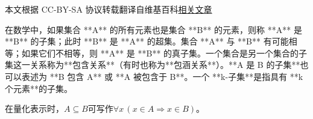 
本文根据 CC-BY-SA 协议转载翻译自维基百科\href{https://en.wikipedia.org/wiki/Subset}{相关文章}

在数学中，如果集合 **A** 的所有元素也是集合 **B** 的元素，则称 **A** 是 **B** 的子集；此时 **B** 是 **A** 的超集。集合 **A** 与 **B** 有可能相等；如果它们不相等，则 **A** 是 **B** 的真子集。一个集合是另一个集合的子集这一关系称为**包含关系**（有时也称为**包涵关系**）。**A 是 B 的子集**也可以表述为 **B 包含 A** 或 **A 被包含于 B**。一个 **k-子集**是指具有 **k 个元素**的子集。

在量化表示时，$A \subseteq B$可写作$\forall x \,(x \in A \Rightarrow x \in B)$。
